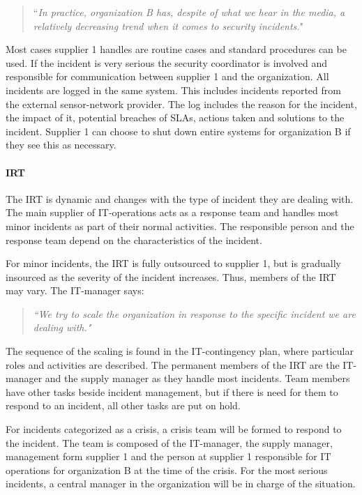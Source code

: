 \begin{quote}
``\textit{In practice, organization B has, despite of what we hear in the media, a relatively decreasing trend when it comes to security incidents.}"
\end{quote}

Most cases supplier 1 handles are routine cases and standard procedures can be used. If the incident is very serious the security coordinator is involved and responsible for communication between supplier 1 and the organization. All incidents are logged in the same system. This includes incidents reported from the external sensor-network provider. The log includes the reason for the incident, the impact of it, potential breaches of \acp{SLA}, actions taken and solutions to the incident. Supplier 1 can choose to shut down entire systems for organization B if they see this as necessary.

\paragraph{\acl{IRT}}
The \ac{IRT} is dynamic and changes with the type of incident they are dealing with. The main supplier of IT-operations acts as a response team and handles most minor incidents as part of their normal activities. The responsible person and the response team depend on the characteristics of the incident.   

For minor incidents, the \ac{IRT} is fully outsourced to supplier 1, but is gradually insourced as the severity of the incident increases. Thus, members of the \ac{IRT} may vary. The IT-manager says:
\begin{quote}
\textit{``We try to scale the organization in response to the specific incident we are dealing with."}
\end{quote}

The sequence of the scaling is found in the IT-contingency plan, where particular roles and activities are described. The permanent members of the \ac{IRT} are the IT-manager and the supply manager as they handle most incidents. Team members have other tasks beside incident management, but if there is need for them to respond to an incident, all other tasks are put on hold.

For incidents categorized as a crisis, a crisis team will be formed to respond to the incident. The team is composed of the IT-manager, the supply manager, management form supplier 1 and the person at supplier 1 responsible for IT operations for organization B at the time of the crisis. For the most serious incidents, a central manager in the organization will be in charge of the situation.

